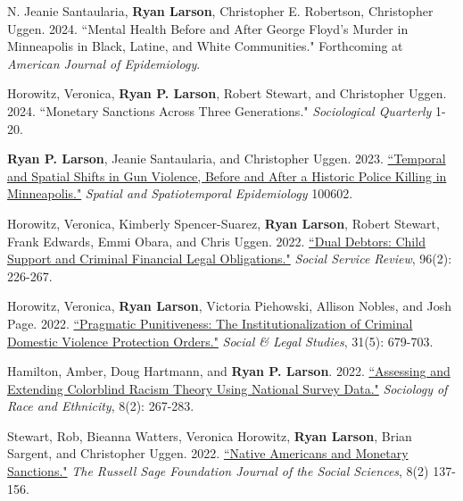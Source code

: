 \documentclass[letterpaper]{article}
\renewenvironment{itemize}{
  \begin{list}{}{
    \setlength{\leftmargin}{1.5em}
  }
}{
  \end{list}
}
\begin{document}
\begin{itemize}

\item N. Jeanie Santaularia, \textbf{Ryan Larson}, Christopher E. Robertson, Christopher Uggen. 2024. ``Mental Health Before and After George Floyd’s Murder in Minneapolis in Black, Latine, and White Communities." Forthcoming at \textit{American Journal of Epidemiology}. 

\item Horowitz, Veronica, \textbf{Ryan P. Larson}, Robert Stewart, and Christopher Uggen. 2024. ``Monetary Sanctions Across Three Generations." \textit{Sociological Quarterly} 1-20.

\item \textbf{Ryan P. Larson}, Jeanie Santaularia, and Christopher Uggen. 2023. \href{https://ryanplarson.github.io/personal_site/pubs/larson_etal_23_online.pdf}{``Temporal and Spatial Shifts in Gun Violence, Before and After a Historic Police Killing in Minneapolis."} \textit{Spatial and Spatiotemporal Epidemiology} 100602.

\item Horowitz, Veronica, Kimberly Spencer-Suarez, \textbf{Ryan Larson}, Robert Stewart, Frank Edwards, Emmi Obara, and Chris Uggen. 2022. \href{https://ryanplarson.github.io/personal_site/pubs/horowitz_etal_22.pdf}{``Dual Debtors: Child Support and Criminal Financial Legal Obligations."} \textit{Social Service Review}, 96(2): 226-267.

\item Horowitz, Veronica,  \textbf{Ryan Larson}, Victoria Piehowski, Allison Nobles, and Josh Page. 2022. \href{https://ryanplarson.github.io/personal_site/pubs/horowitz_etal_21.pdf}{``Pragmatic Punitiveness: The Institutionalization of Criminal Domestic Violence Protection Orders."} \textit{Social \& Legal Studies}, 31(5): 679-703.

\item Hamilton, Amber, Doug Hartmann, and \textbf{Ryan P. Larson}. 2022. \href{https://ryanplarson.github.io/personal_site/pubs/hamilton_etal_22.pdf}{``Assessing and Extending Colorblind Racism Theory Using National Survey Data."} \textit{Sociology of Race and Ethnicity}, 8(2): 267-283.

\item Stewart, Rob, Bieanna Watters, Veronica Horowitz, \textbf{Ryan Larson}, Brian Sargent, and Christopher Uggen. 2022. \href{https://ryanplarson.github.io/personal_site/pubs/stewart_etal_22.pdf}{``Native Americans and Monetary Sanctions."} \textit{The Russell Sage Foundation Journal of the Social Sciences}, 8(2) 137-156.


\end{itemize}
\end{document}
